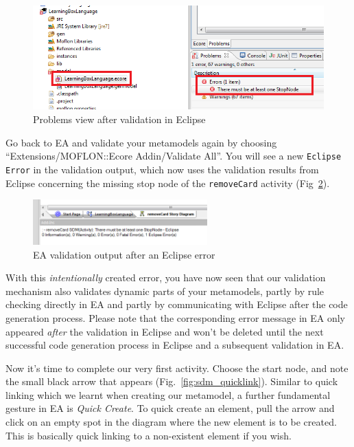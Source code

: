 \begin{figure}[htp]
\begin{center}
  \includegraphics[width=\textwidth]{pics/sdmBilder/removeCard/sdm17RAW}
  \caption{Problems view after validation in Eclipse}  
  \label{fig:eclipse_problems_view}
\end{center}
\end{figure}

Go back to EA and validate your metamodels again by choosing ``Extensions/MOFLON::Ecore Addin/Validate All''.
You will see a new \texttt{Eclipse Error} in the validation output, which now uses the validation results from Eclipse concerning the missing stop node of the \texttt{removeCard} activity (Fig~\ref{fig:ea_eclipse_error}). 


\begin{figure}[htp]
\begin{center}
  \includegraphics[width=0.6\textwidth]{pics/sdmBilder/removeCard/sdm16RAW}
  \caption{EA validation output after an Eclipse error}  
  \label{fig:ea_eclipse_error}
\end{center}
\end{figure}

With this \emph{intentionally} created error, you have now seen that our validation mechanism also validates dynamic parts of your metamodels, partly by rule checking directly in EA and partly by communicating with Eclipse after the code generation process. 
Please note that the corresponding error message in EA only appeared \emph{after} the validation in Eclipse and won't be deleted until the next successful code generation process in Eclipse and a subsequent validation in EA.

Now it's time to complete our very first activity. Choose the start node, and
note the small black arrow that appears (Fig.~\ref{fig:sdm_quicklink}).  Similar to quick linking which we learnt when
creating our metamodel, a further fundamental gesture in EA is \emph{Quick
Create}. To quick create an element, pull the arrow and click on an empty spot
in the diagram where the new element is to be created.  This is basically quick
linking to a non-existent element if you wish.

